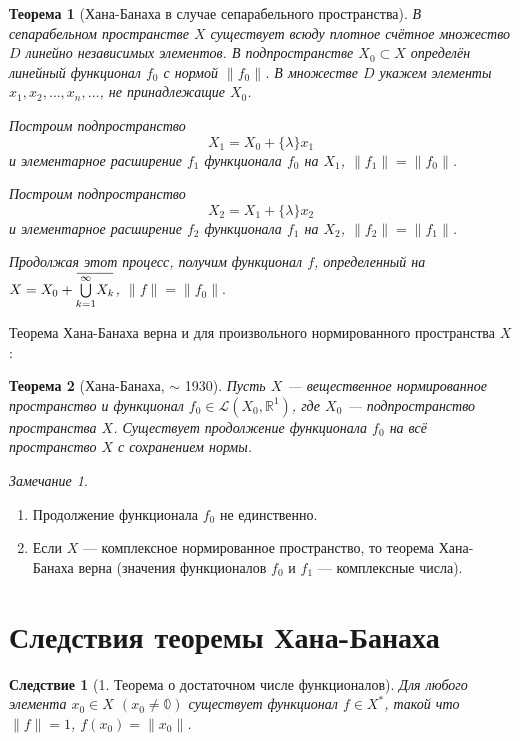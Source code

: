 \documentclass[12pt,a4paper,titlepage,oneside]{book}
\newcommand{\overbar}[1]{\mkern 1.5mu\overline{\mkern-1.5mu#1\mkern-1.5mu}\mkern 1.5mu}
\theoremstyle{definition}
\theoremstyle{plain}
\newtheorem*{theorem}{Теорема}
\theoremstyle{break}
\theoremstyle{remark}
\newtheorem*{remark}{Замечание}
\theoremstyle{remark}
\theoremstyle{remark}
\theoremstyle{remark}
\theoremstyle{plain}
\theoremstyle{plain}
\newtheorem*{corollary}{Следствие}
\begin{document}
\begin{theorem}[Хана-Банаха в случае сепарабельного пространства]
В сепарабельном пространстве $X$ существует всюду плотное счётное множество $D$ линейно независимых элементов. В подпространстве $X_0 \subset X$ определён линейный функционал $f_0$ с нормой $\lVert f_0 \rVert$. В множестве $D$ укажем элементы $x_1, x_2, \ldots, x_n,\ldots$, не принадлежащие $X_0$.

Построим подпространство
$$X_1=X_0+\{ \lambda\}x_1 $$
и элементарное расширение $f_1$ функционала $f_0$ на $X_1$, $\lVert f_1 \rVert= \lVert f_0 \rVert$.

Построим подпространство
$$X_2=X_1+\{ \lambda\}x_2 $$
и элементарное расширение $f_2$ функционала $f_1$ на $X_2$, $\lVert f_2 \rVert= \lVert f_1 \rVert$.

Продолжая этот процесс, получим функционал $f$, определенный на $X=X_0+\overbar{\overset{\infty}{\underset{k=1}{\bigcup}}X_k}$, $\lVert f \rVert= \lVert f_0 \rVert.$
\end{theorem}
Теорема Хана-Банаха верна и для произвольного нормированного пространства $X$: 
\begin{theorem}[Хана-Банаха, $\sim$ 1930]
Пусть $X$ --- вещественное нормированное пространство и функционал $f_0 \in \mathcal{L}(X_0, \mathbb{R}^1)$, где $X_0$ --- подпространство пространства $X$. Существует продолжение функционала $f_0$ на всё пространство $X$ с сохранением нормы. 
\end{theorem}
\begin{remark}
\leavevmode
\begin{enumerate}
\item Продолжение функционала $f_0$ не единственно.
\item Если $X$ --- комплексное нормированное пространство, то теорема Хана-Банаха верна (значения функционалов $f_0$ и $f_1$ --- комплексные числа).
\end{enumerate}
\end{remark}

\section{Следствия теоремы Хана-Банаха}

\begin{corollary}[1. Теорема о достаточном числе функционалов]
Для любого элемента $x_0 \in X$ $(x_0 \ne \mathbb{0})$ существует функционал $f \in X^*$, такой что $\lVert f \rVert=1$, $f(x_0)=\lVert x_0\rVert$.
\end{corollary}
\end{document}
